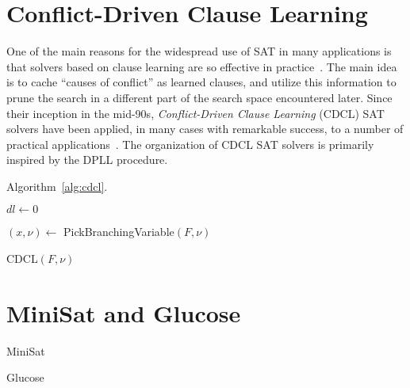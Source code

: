 \section{Conflict-Driven Clause Learning}
\label{sec:cdcl}

One of the main reasons for the widespread use of SAT in many applications is
that solvers based on clause learning are so effective in
practice~\cite{satchapter}. The main idea is to cache ``causes of conflict'' as
learned clauses, and utilize this information to prune the search in a different
part of the search space encountered later. Since their inception in the
mid-90s, \emph{Conflict-Driven Clause Learning} (CDCL) SAT solvers have been
applied, in many cases with remarkable success, to a number of practical
applications~\cite{cdclchapter}. The organization of CDCL SAT solvers is
primarily inspired by the DPLL procedure.
 
Algorithm~\ref{alg:cdcl}.

\begin{algorithm}[!ht]
    \Input{}
    \Output{}

    {}

    $dl \leftarrow 0$

    {$(x, \nu) \leftarrow$ PickBranchingVariable$(F,\nu)$}

    \caption{CDCL$(F, \nu)$}
\label{alg:cdcl}
\end{algorithm}

\section{MiniSat and Glucose}
\label{sec:minisat}
MiniSat~\cite{minisat}

Glucose~\cite{glucose}

